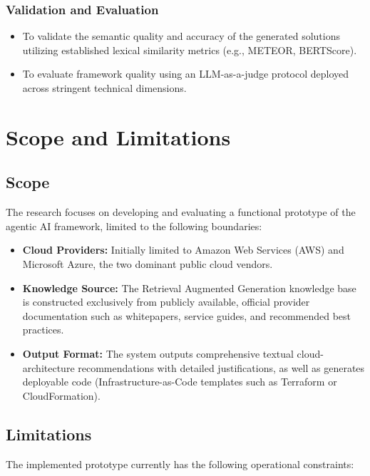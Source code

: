 \subsubsection*{Validation and Evaluation}
\begin{itemize}
    \item To validate the semantic quality and accuracy of the generated solutions utilizing established lexical similarity metrics (e.g., METEOR, BERTScore).
    \item To evaluate framework quality using an LLM-as-a-judge protocol deployed across stringent technical dimensions.
\end{itemize}


\section{Scope and Limitations}

\subsection{Scope}

The research focuses on developing and evaluating a functional prototype of the agentic AI framework, limited to the following boundaries:

\begin{itemize}
    \item \textbf{Cloud Providers:} Initially limited to Amazon Web Services (AWS) and Microsoft Azure, the two dominant public cloud vendors.
    \item \textbf{Knowledge Source:} The Retrieval Augmented Generation knowledge base is constructed exclusively from publicly available, official provider documentation such as whitepapers, service guides, and recommended best practices.
    \item \textbf{Output Format:} The system outputs comprehensive textual cloud-architecture recommendations with detailed justifications, as well as generates deployable code (Infrastructure-as-Code templates such as Terraform or CloudFormation).
\end{itemize}

\subsection{Limitations}

The implemented prototype currently has the following operational constraints:


